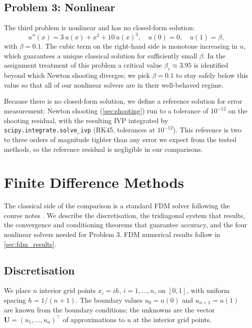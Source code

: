 \documentclass[11pt]{article}
\theoremstyle{plain}
\theoremstyle{remark}
\begin{document}
\subsection{Problem 3: Nonlinear}
\label{sec:prob3}

The third problem is nonlinear and has no closed-form solution:
\begin{equation}
u''(x) = 3\,u(x) + x^2 + 10\,u(x)^3, \quad u(0) = 0, \quad u(1) = \beta,
\label{eq:prob3}
\end{equation}
with $\beta = 0.1$. The cubic term on the right-hand side is monotone
increasing in $u$, which guarantees a unique classical solution for
sufficiently small $\beta$. In the assignment treatment of this problem
\citep{khouider2026bvp} a critical value $\beta_c \approx 3.95$ is identified
beyond which Newton shooting diverges; we pick $\beta = 0.1$ to stay safely
below this value so that all of our nonlinear solvers are in their
well-behaved regime.

Because there is no closed-form solution, we define a reference solution for
error measurement: Newton shooting (\cref{sec:shooting}) run to a tolerance
of $10^{-12}$ on the shooting residual, with the resulting IVP integrated by
\texttt{scipy.integrate.solve\_ivp} (RK45, tolerances at $10^{-12}$). This
reference is two to three orders of magnitude tighter than any error we
expect from the tested methods, so the reference residual is negligible in
our comparisons.


\section{Finite Difference Methods}
\label{sec:fdm}

The classical side of the comparison is a standard FDM solver following the
course notes \citep{khouider2026notes}. We describe the discretisation, the
tridiagonal system that results, the convergence and conditioning theorems
that guarantee accuracy, and the four nonlinear solvers needed for Problem 3.
FDM numerical results follow in \cref{sec:fdm_results}.


\subsection{Discretisation}
\label{sec:fdm_disc}

We place $n$ interior grid points
$x_i = ih$, $i = 1, \dots, n$, on $[0,1]$, with uniform spacing
$h = 1/(n+1)$. The boundary values $u_0 = u(0)$ and $u_{n+1} = u(1)$ are
known from the boundary conditions; the unknowns are the vector
$\mathbf{U} = (u_1, \dots, u_n)^\top$ of approximations to $u$ at the
interior grid points.
\end{document}
